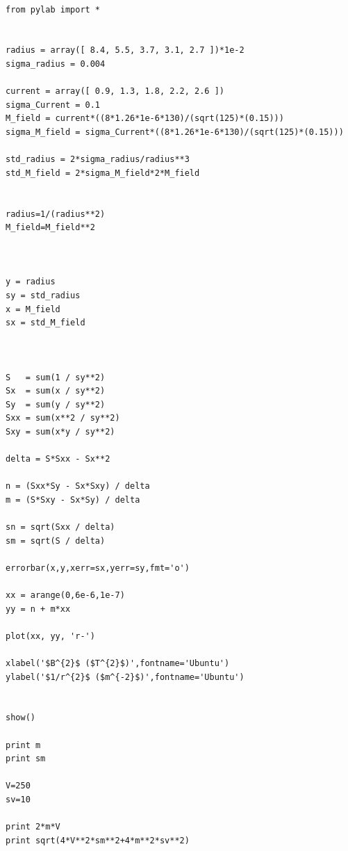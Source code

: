 \documentclass[aps,nofootinbib,onecolumn,groupedaddress,a4paper]{revtex4}
\begin{document}
\begin{lstlisting}

from pylab import *


radius = array([ 8.4, 5.5, 3.7, 3.1, 2.7 ])*1e-2 		
sigma_radius = 0.004                                      

current = array([ 0.9, 1.3, 1.8, 2.2, 2.6 ]) 				
sigma_Current = 0.1 										
M_field = current*((8*1.26*1e-6*130)/(sqrt(125)*(0.15))) 	
sigma_M_field = sigma_Current*((8*1.26*1e-6*130)/(sqrt(125)*(0.15)))		

std_radius = 2*sigma_radius/radius**3
std_M_field = 2*sigma_M_field*2*M_field


radius=1/(radius**2)
M_field=M_field**2



y = radius
sy = std_radius
x = M_field
sx = std_M_field



S   = sum(1 / sy**2)
Sx  = sum(x / sy**2)
Sy  = sum(y / sy**2)
Sxx = sum(x**2 / sy**2)
Sxy = sum(x*y / sy**2)

delta = S*Sxx - Sx**2

n = (Sxx*Sy - Sx*Sxy) / delta
m = (S*Sxy - Sx*Sy) / delta

sn = sqrt(Sxx / delta)
sm = sqrt(S / delta)

errorbar(x,y,xerr=sx,yerr=sy,fmt='o')

xx = arange(0,6e-6,1e-7)
yy = n + m*xx

plot(xx, yy, 'r-')

xlabel('$B^{2}$ ($T^{2}$)',fontname='Ubuntu')
ylabel('$1/r^{2}$ ($m^{-2}$)',fontname='Ubuntu')


show()

print m
print sm

V=250
sv=10

print 2*m*V
print sqrt(4*V**2*sm**2+4*m**2*sv**2)



\end{lstlisting}
\end{document}
